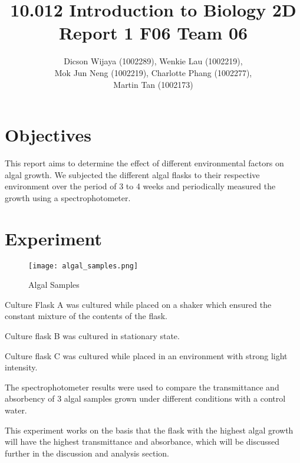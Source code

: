 \documentclass[12pt,a4paper]{IEEEtran}
\author{Dicson Wijaya (1002289), Wenkie Lau (1002219), \\ Mok Jun Neng (1002219), Charlotte Phang (1002277), \\ Martin Tan (1002173)}
\title{10.012 Introduction to Biology 2D \\ Report 1 F06 Team 06}
\begin{document}
	
	\maketitle
	
	\section{Objectives} \vspace{-0.6in}
	This report aims to determine the effect of different environmental factors on algal growth. We subjected the different algal flasks to their respective environment over the period of 3 to 4 weeks and periodically measured the growth using a spectrophotometer. \vspace{-0.8in}
	
	\section{Experiment} \vspace{-0.9in}
	\begin{figure}[H]
		\begin{center}
			\texttt{[image: algal\_samples.png]}
			\caption{Algal Samples}
			\label{fig:algalsamples}
		\end{center}
	\end{figure} \vspace{-0.4in}
    Culture Flask A was cultured while placed on a shaker which ensured the constant mixture of the contents of the flask. \\ \vspace{-4mm}
    
    Culture flask B was cultured in stationary state. \\ \vspace{-4mm}
    
    Culture flask C was cultured while placed in an environment with strong light intensity. \\ \vspace{-2mm}
    
    The spectrophotometer results were used to compare the transmittance and absorbency of 3 algal samples grown under different conditions with a control water. \\ \vspace{-0.4mm}
    
    This experiment works on the basis that the flask with the highest algal growth will have the highest transmittance and absorbance, which will be discussed further in the discussion and analysis section. \vspace{-0.18in}
    
\end{document}
